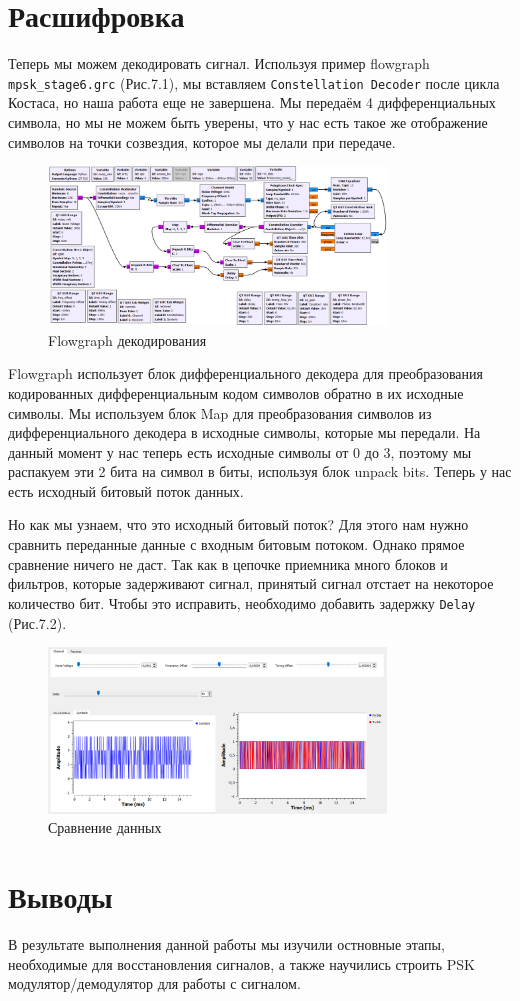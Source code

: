 \documentclass[a4paper,12pt]{report}
\begin{document}
\chapter{Расшифровка}
    Теперь мы можем декодировать сигнал. Используя пример flowgraph \texttt{mpsk\_stage6.grc} (Рис.7.1), мы вставляем \texttt{Constellation Decoder} после цикла Костаса, но наша работа еще не завершена. Мы передаём 4 дифференциальных символа, но мы не можем быть уверены, что у нас есть такое же отображение символов на точки созвездия, которое мы делали при передаче. 
\begin{figure}[H]
        \centering
        \includegraphics[width=0.8\textwidth]{fig7-1.PNG}
        \caption{Flowgraph декодирования}
        \label{fig:fig7-1}
\end{figure}
    
    Flowgraph использует блок дифференциального декодера для преобразования кодированных дифференциальным кодом символов обратно в их исходные символы. Мы используем блок Map для преобразования символов из дифференциального декодера в исходные символы, которые мы передали. На данный момент у нас теперь есть исходные символы от 0 до 3, поэтому мы распакуем эти 2 бита на символ в биты, используя блок unpack bits. Теперь у нас есть исходный битовый поток данных.
    
     Но как мы узнаем, что это исходный битовый поток? Для этого нам нужно сравнить переданные данные с входным битовым потоком. Однако прямое сравнение ничего не даст. Так как в цепочке приемника много блоков и фильтров, которые задерживают сигнал, принятый сигнал отстает на некоторое количество бит. Чтобы это исправить, необходимо добавить задержку \texttt{Delay} (Рис.7.2).
\begin{figure}[H]
        \centering
        \includegraphics[width=0.8\textwidth]{fig7-2.PNG}
        \caption{Сравнение данных}
        \label{fig:fig7-2}
\end{figure}

\chapter{Выводы}
    В результате выполнения данной работы мы изучили остновные этапы, необходимые для восстановления сигналов, а также научились строить PSK модулятор/демодулятор для работы с сигналом.  
\end{document}
